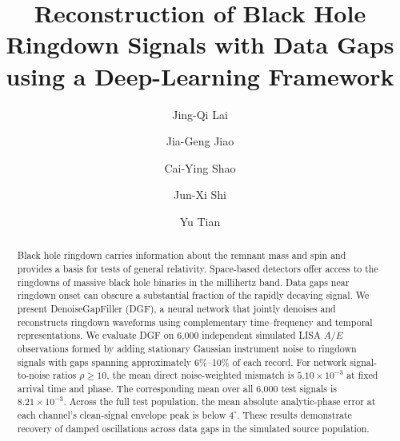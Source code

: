 \documentclass[10pt,prd,aps,a4paper,twocolumn,superscriptaddress,nofootinbib,floatfix]{revtex4-2}
\begin{document}
\title{Reconstruction of Black Hole Ringdown Signals with Data Gaps using a Deep-Learning Framework}
\author{Jing-Qi Lai}
\author{Jia-Geng Jiao}
\author{Cai-Ying Shao}

\author{Jun-Xi Shi}
\author{Yu Tian}

\begin{abstract}
Black hole ringdown carries information about the remnant mass and spin and provides a basis for tests of general relativity. Space-based detectors offer access to the ringdowns of massive black hole binaries in the millihertz band. Data gaps near ringdown onset can obscure a substantial fraction of the rapidly decaying signal. We present DenoiseGapFiller (DGF), a neural network that jointly denoises and reconstructs ringdown waveforms using complementary time--frequency and temporal representations. We evaluate DGF on 6,000 independent simulated LISA $A/E$ observations formed by adding stationary Gaussian instrument noise to ringdown signals with gaps spanning approximately 6\%--10\% of each record. For network signal-to-noise ratios $\rho\ge10$, the mean direct noise-weighted mismatch is $5.10\times10^{-3}$ at fixed arrival time and phase. The corresponding mean over all 6,000 test signals is $8.21\times10^{-3}$. Across the full test population, the mean absolute analytic-phase error at each channel's clean-signal envelope peak is below $4^\circ$. These results demonstrate recovery of damped oscillations across data gaps in the simulated source population.
\end{abstract}

\maketitle
\end{document}
